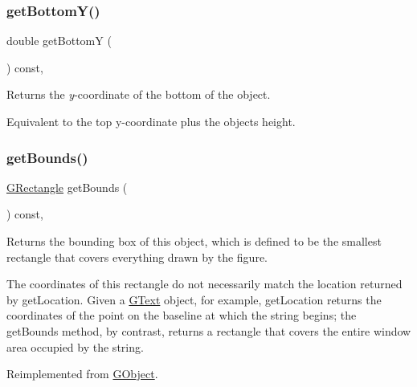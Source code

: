 \subsubsection{\texorpdfstring{get\+Bottom\+Y()}{getBottomY()}}
{\footnotesize\ttfamily double get\+BottomY (\begin{DoxyParamCaption}{ }\end{DoxyParamCaption}) const\hspace{0.3cm}{\ttfamily [virtual]}, {\ttfamily [inherited]}}



Returns the {\itshape y}-\/coordinate of the bottom of the object. 

Equivalent to the top y-\/coordinate plus the object\textquotesingle{}s height. \mbox{\label{classsgl_1_1GArc_a89040ce9277825772d359fccd33bca86}} 
\subsubsection{\texorpdfstring{get\+Bounds()}{getBounds()}}
{\footnotesize\ttfamily \mbox{\hyperlink{structsgl_1_1GRectangle}{G\+Rectangle}} get\+Bounds (\begin{DoxyParamCaption}{ }\end{DoxyParamCaption}) const\hspace{0.3cm}{\ttfamily [override]}, {\ttfamily [virtual]}}



Returns the bounding box of this object, which is defined to be the smallest rectangle that covers everything drawn by the figure. 

The coordinates of this rectangle do not necessarily match the location returned by {\ttfamily get\+Location}. Given a {\ttfamily \mbox{\hyperlink{classsgl_1_1GText}{G\+Text}}} object, for example, {\ttfamily get\+Location} returns the coordinates of the point on the baseline at which the string begins; the {\ttfamily get\+Bounds} method, by contrast, returns a rectangle that covers the entire window area occupied by the string. 

Reimplemented from \mbox{\hyperlink{classsgl_1_1GObject_a29e6ac35a0b48f491a4c88194cc5da3b}{G\+Object}}.

\mbox{\label{classsgl_1_1GObject_a0909472e91448470bccdb62ecfb95d8b}} 
